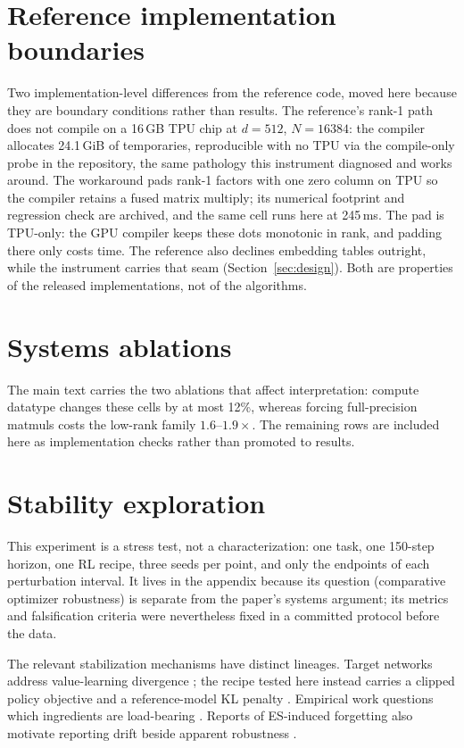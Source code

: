 \section{Reference implementation boundaries}
\label{sec:refimpl}
Two implementation-level differences from the reference code, moved here
because they are boundary conditions rather than results. The reference's
rank-1 path does not compile on a 16\,GB TPU chip at $d{=}512$,
$N{=}16384$: the compiler allocates 24.1\,GiB of temporaries,
reproducible with no TPU via the compile-only probe in the repository,
the same pathology this instrument diagnosed and works around. The workaround
pads rank-1 factors with one zero column on TPU so the compiler retains a fused
matrix multiply; its numerical footprint and regression check are archived, and
the same cell runs here at 245\,ms. The pad is TPU-only: the GPU compiler keeps
these dots monotonic in rank, and padding there only costs time. The reference also declines embedding tables
outright, while the instrument carries that seam
(Section~\ref{sec:design}). Both are properties of the released
implementations, not of the algorithms.

\section{Systems ablations}
\label{sec:systems-ablations}

The main text carries the two ablations that affect interpretation: compute
datatype changes these cells by at most 12\%, whereas forcing full-precision
matmuls costs the low-rank family $1.6$--$1.9\times$. The remaining rows are
included here as implementation checks rather than promoted to results.

\section{Stability exploration}
\label{sec:stability}
This experiment is a stress test, not a characterization: one task, one
150-step horizon, one RL recipe, three seeds per point, and only the
endpoints of each perturbation interval. It lives in the appendix
because its question (comparative optimizer robustness) is separate from
the paper's systems argument; its metrics and falsification criteria
were nevertheless fixed in a committed protocol before the data.

The relevant stabilization mechanisms have distinct lineages. Target networks
address value-learning divergence
\citep{baird1995,tsitsiklis1997,mnih2015,vanhasselt2018,zhang2021target}; the
recipe tested here instead carries a clipped policy objective and a
reference-model KL penalty
\citep{kakade2002,schulman2015trpo,schulman2017ppo,ouyang2022}. Empirical work
questions which ingredients are load-bearing
\citep{engstrom2020,andrychowicz2020,orz2025}. Reports of ES-induced forgetting
also motivate reporting drift beside apparent robustness
\citep{abdi2026forgetting,schweighofer2026awd}.

